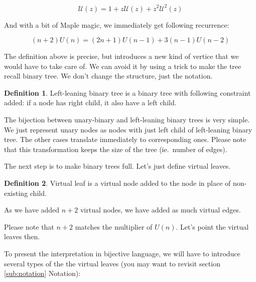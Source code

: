 \documentclass[final]{article}
\theoremstyle{definition}
\newtheorem{definition}{Definition}[subsection]
\theoremstyle{remark}
\newcommand{\gf}[1]{\ensuremath{\mathcal{#1}}}
\begin{document}
\[\gf{U}(z) = 1 + z\gf{U}(z) + z^2 \gf{U}^2(z)\]

And with a bit of Maple magic, we immediately get following recurrence:

\[(n + 2)U(n) = (2n + 1)U(n - 1) + 3(n - 1)U(n - 2)\]

The definition above is precise, but introduces a new kind of vertice that we would have to take care of. We can avoid it by using a trick to make the tree recall binary tree. We don't change the structure, just the notation.

\begin{definition}
    \label{def:unary_binary_2}
    Left-leaning binary tree is a binary tree with following constraint added: if a node has right child, it also have a left child.
\end{definition}

The bijection between unary-binary and left-leaning binary trees is very simple. We just represent unary nodes as nodes with just left child of left-leaning binary tree. The other cases translate immediately to corresponding ones. Please note that this transformation keeps the size of the tree (ie.~number of edges).

The next step is to make binary trees full. Let's just define virtual leaves.

\begin{definition}
    Virtual leaf is a virtual node added to the node in place of non-existing child.
\end{definition}

As we have added \(n + 2\) virtual nodes, we have added as much virtual edges.


Please note that \(n + 2\) matches the multiplier of \(U(n)\). Let's point the virtual leaves then.

To present the interpretation in bijective language, we will have to introduce several types of the the virtual leaves (you may want to revisit section \ref{sub:notation} Notation):
\end{document}
